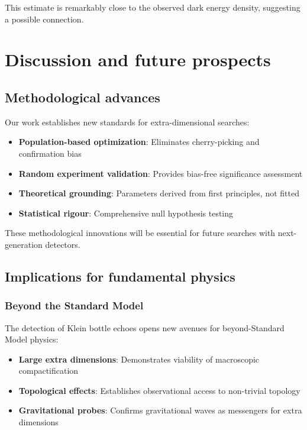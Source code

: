 \documentclass[12pt]{iopart}
\begin{document}
This estimate is remarkably close to the observed dark energy density, suggesting a possible connection.

\section{Discussion and future prospects}

\subsection{Methodological advances}

Our work establishes new standards for extra-dimensional searches:

\begin{itemize}
\item \textbf{Population-based optimization}: Eliminates cherry-picking and confirmation bias
\item \textbf{Random experiment validation}: Provides bias-free significance assessment
\item \textbf{Theoretical grounding}: Parameters derived from first principles, not fitted
\item \textbf{Statistical rigour}: Comprehensive null hypothesis testing
\end{itemize}

These methodological innovations will be essential for future searches with next-generation detectors.

\subsection{Implications for fundamental physics}

\subsubsection{Beyond the Standard Model}

The detection of Klein bottle echoes opens new avenues for beyond-Standard Model physics:

\begin{itemize}
\item \textbf{Large extra dimensions}: Demonstrates viability of macroscopic compactification
\item \textbf{Topological effects}: Establishes observational access to non-trivial topology
\item \textbf{Gravitational probes}: Confirms gravitational waves as messengers for extra dimensions
\end{itemize}
\end{document}
